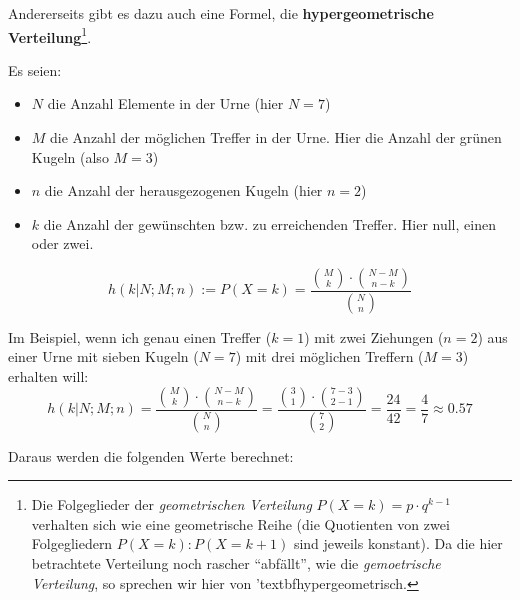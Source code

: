 Andererseits gibt es dazu auch eine Formel, die \textbf{hypergeometrische Verteilung}\footnote{Die Folgeglieder der \textit{geometrischen Verteilung} $P(X=k) = p\cdot{}q^{k-1}$ verhalten sich wie eine geometrische Reihe (die Quotienten von zwei Folgegliedern $P(X=k) : P(X=k+1)$ sind jeweils konstant). Da die hier betrachtete Verteilung noch rascher ``abfällt'', wie die \textit{gemoetrische Verteilung}, so sprechen wir hier von 'textbf{hyper}geometrisch.}.

Es seien:
\begin{itemize}
\item $N$ die Anzahl Elemente in der Urne (hier $N = 7$)
\item $M$ die Anzahl der möglichen Treffer in der Urne. Hier die Anzahl der grünen Kugeln (also $M = 3$)
\item $n$ die Anzahl der herausgezogenen Kugeln (hier $n = 2$)
\item $k$ die Anzahl der gewünschten bzw. zu erreichenden Treffer. Hier \zB null, einen oder zwei.
\end{itemize}
\begin{gesetz}{}{}
$$h(k|N;M;n) := P(X=k) = \frac{ {M\choose k} \cdot{} {{N-M}\choose {n-k}}}{{N \choose n}}$$
\end{gesetz}

Im Beispiel, wenn ich genau einen Treffer ($k=1$) mit zwei Ziehungen ($n=2$) aus einer Urne mit sieben Kugeln ($N=7$) mit drei möglichen Treffern ($M=3$) erhalten will:
$$h(k|N;M;n) = \frac{ {M\choose k} \cdot{} {{N-M}\choose {n-k}}}{{N \choose n}} = \frac{ {3\choose 1} \cdot{} {{7-3}\choose {2-1}}}{{7 \choose 2}} = \frac{24}{42} = \frac47 \approx 0.57$$
\newpage


Daraus werden die folgenden Werte berechnet:

